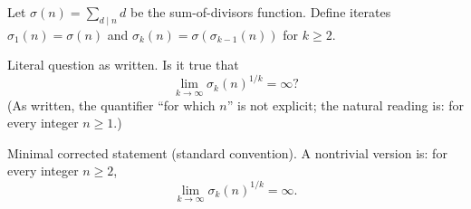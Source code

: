 Let $\sigma(n)=\sum_{d\mid n} d$ be the sum-of-divisors function.
Define iterates $\sigma_1(n)=\sigma(n)$ and $\sigma_k(n)=\sigma(\sigma_{k-1}(n))$ for $k\ge 2$.

Literal question as written.
Is it true that
\[
\lim_{k\to\infty} \sigma_k(n)^{1/k}=\infty?
\]
(As written, the quantifier “for which $n$” is not explicit; the natural reading is: for every integer $n\ge 1$.)

Minimal corrected statement (standard convention).
A nontrivial version is: for every integer $n\ge 2$,
\[
\lim_{k\to\infty} \sigma_k(n)^{1/k}=\infty.
\]
